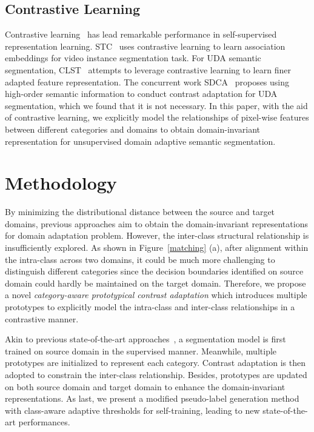 \documentclass[runningheads]{llncs}
\begin{document}
\subsection{Contrastive Learning}
Contrastive learning~\cite{he2020momentum, chen2020simple,zhou2021domain} has lead remarkable performance in self-supervised representation learning. STC~\cite{jiang2022stc} uses contrastive learning to learn association embeddings for video instance segmentation task. For UDA semantic segmentation, CLST~\cite{marsden2021contrastive} attempts to leverage contrastive learning to learn finer adapted feature representation. The concurrent work SDCA~\cite{li2021semantic} proposes using high-order semantic information to conduct contrast adaptation for UDA segmentation, which we found that it is not necessary. In this paper, with the aid of contrastive learning, we explicitly model the relationships of pixel-wise features between different categories and domains to obtain domain-invariant representation for unsupervised domain adaptive semantic segmentation.
 \section{Methodology}
By minimizing the distributional distance between the source and target domains, previous approaches aim to obtain the domain-invariant representations for domain adaptation problem. However, the inter-class structural relationship is insufficiently explored. As shown in Figure~\ref{matching} (a), after alignment within the intra-class across two domains, it could be much more challenging to distinguish different categories since the decision boundaries identified on source domain could hardly be maintained on the target domain. Therefore, we propose a novel \emph{category-aware prototypical contrast adaptation} which introduces multiple prototypes to explicitly model the intra-class and inter-class relationships in a contrastive manner. 

Akin to previous state-of-the-art approaches~\cite{wang2020classes,zhang2021prototypical,li2021semantic}, a segmentation model is first trained on source domain in the supervised manner. Meanwhile, multiple prototypes are initialized to represent each category. Contrast adaptation is then adopted to constrain the inter-class relationship. Besides, prototypes are updated on both source domain and target domain to enhance the domain-invariant representations. As last, we present a modified pseudo-label generation method with class-aware adaptive thresholds for self-training, leading to new state-of-the-art performances. 
\end{document}
